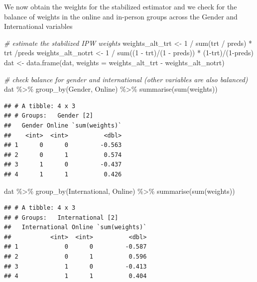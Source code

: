 \documentclass[
  ignorenonframetext,
]{beamer}
\newenvironment{Shaded}{\begin{snugshade}}{\end{snugshade}}
\newcommand{\AttributeTok}[1]{\textcolor[rgb]{0.77,0.63,0.00}{#1}}
\newcommand{\CommentTok}[1]{\textcolor[rgb]{0.56,0.35,0.01}{\textit{#1}}}
\newcommand{\DecValTok}[1]{\textcolor[rgb]{0.00,0.00,0.81}{#1}}
\newcommand{\FunctionTok}[1]{\textcolor[rgb]{0.00,0.00,0.00}{#1}}
\newcommand{\NormalTok}[1]{#1}
\newcommand{\OtherTok}[1]{\textcolor[rgb]{0.56,0.35,0.01}{#1}}
\newcommand{\SpecialCharTok}[1]{\textcolor[rgb]{0.00,0.00,0.00}{#1}}
\begin{document}
\begin{frame}[fragile]{}
\protect\hypertarget{section-17}{}
We now obtain the weights for the stabilized estimator and we check for
the balance of weights in the online and in-person groups across the
Gender and International variables

\vspace{12pt}
\tiny

\begin{Shaded}
\begin{Highlighting}[]
\CommentTok{\# estimate the stabilized IPW weights  }
\NormalTok{weights\_alt\_trt }\OtherTok{\textless{}{-}} \DecValTok{1} \SpecialCharTok{/} \FunctionTok{sum}\NormalTok{(trt }\SpecialCharTok{/}\NormalTok{ preds) }\SpecialCharTok{*}\NormalTok{ trt }\SpecialCharTok{/}\NormalTok{preds}
\NormalTok{weights\_alt\_notrt }\OtherTok{\textless{}{-}} \DecValTok{1} \SpecialCharTok{/} \FunctionTok{sum}\NormalTok{((}\DecValTok{1} \SpecialCharTok{{-}}\NormalTok{ trt)}\SpecialCharTok{/}\NormalTok{(}\DecValTok{1} \SpecialCharTok{{-}}\NormalTok{ preds)) }\SpecialCharTok{*}\NormalTok{ (}\DecValTok{1}\SpecialCharTok{{-}}\NormalTok{trt)}\SpecialCharTok{/}\NormalTok{(}\DecValTok{1}\SpecialCharTok{{-}}\NormalTok{preds)}
\NormalTok{dat }\OtherTok{\textless{}{-}} \FunctionTok{data.frame}\NormalTok{(dat, }\AttributeTok{weights =}\NormalTok{ weights\_alt\_trt }\SpecialCharTok{{-}}\NormalTok{ weights\_alt\_notrt)}

\CommentTok{\# check balance for gender and international (other variables are also balanced)}
\NormalTok{dat }\SpecialCharTok{\%\textgreater{}\%} \FunctionTok{group\_by}\NormalTok{(Gender, Online) }\SpecialCharTok{\%\textgreater{}\%} \FunctionTok{summarise}\NormalTok{(}\FunctionTok{sum}\NormalTok{(weights))}
\end{Highlighting}
\end{Shaded}

\begin{verbatim}
## # A tibble: 4 x 3
## # Groups:   Gender [2]
##   Gender Online `sum(weights)`
##    <int>  <int>          <dbl>
## 1      0      0         -0.563
## 2      0      1          0.574
## 3      1      0         -0.437
## 4      1      1          0.426
\end{verbatim}

\begin{Shaded}
\begin{Highlighting}[]
\NormalTok{dat }\SpecialCharTok{\%\textgreater{}\%} \FunctionTok{group\_by}\NormalTok{(International, Online) }\SpecialCharTok{\%\textgreater{}\%} \FunctionTok{summarise}\NormalTok{(}\FunctionTok{sum}\NormalTok{(weights))}
\end{Highlighting}
\end{Shaded}

\begin{verbatim}
## # A tibble: 4 x 3
## # Groups:   International [2]
##   International Online `sum(weights)`
##           <int>  <int>          <dbl>
## 1             0      0         -0.587
## 2             0      1          0.596
## 3             1      0         -0.413
## 4             1      1          0.404
\end{verbatim}
\end{frame}
\end{document}
